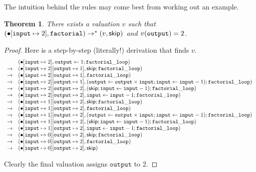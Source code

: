 \documentclass{amsbook}
\newtheorem{theorem}{Theorem}[chapter]
\theoremstyle{definition}
\theoremstyle{remark}
\numberwithin{section}{chapter}
\numberwithin{equation}{chapter}
\begin{document}
The intuition behind the rules may come best from working out an example.

\newcommand{\smallsteps}[2]{#1 \to^* #2}

\begin{theorem}
  There exists a valuation $v$ such that $\smallsteps{(\mupd{\mempty}{\mathtt{input}}{2}, \mathtt{factorial})}{(v, \skipe)}$ and $v(\mathtt{output}) = 2$.
\end{theorem}

\begin{proof}
  Here is a step-by-step (literally!) derivation that finds $v$.
  $$\begin{array}{cl}
    & (\bullet[\mathtt{input} \mapsto 2], \mathtt{output} \leftarrow 1; \mathtt{factorial\_loop}) \\
    \to & (\bullet[\mathtt{input} \mapsto 2][\mathtt{output} \mapsto 1], \mathsf{skip}; \mathtt{factorial\_loop}) \\
    \to & (\bullet[\mathtt{input} \mapsto 2][\mathtt{output} \mapsto 1], \mathtt{factorial\_loop}) \\
    \to & (\bullet[\mathtt{input} \mapsto 2][\mathtt{output} \mapsto 1], (\mathtt{output} \leftarrow \mathtt{output} \times \mathtt{input}; \mathtt{input} \leftarrow \mathtt{input} - 1); \mathtt{factorial\_loop}) \\
    \to & (\bullet[\mathtt{input} \mapsto 2][\mathtt{output} \mapsto 2], (\mathsf{skip}; \mathtt{input} \leftarrow \mathtt{input} - 1); \mathtt{factorial\_loop}) \\
    \to & (\bullet[\mathtt{input} \mapsto 2][\mathtt{output} \mapsto 2], \mathtt{input} \leftarrow \mathtt{input} - 1; \mathtt{factorial\_loop}) \\
    \to & (\bullet[\mathtt{input} \mapsto 1][\mathtt{output} \mapsto 2], \mathsf{skip}; \mathtt{factorial\_loop}) \\
    \to & (\bullet[\mathtt{input} \mapsto 1][\mathtt{output} \mapsto 2], \mathtt{factorial\_loop}) \\
    \to & (\bullet[\mathtt{input} \mapsto 1][\mathtt{output} \mapsto 2], (\mathtt{output} \leftarrow \mathtt{output} \times \mathtt{input}; \mathtt{input} \leftarrow \mathtt{input} - 1); \mathtt{factorial\_loop}) \\
    \to & (\bullet[\mathtt{input} \mapsto 1][\mathtt{output} \mapsto 2], (\mathsf{skip}; \mathtt{input} \leftarrow \mathtt{input} - 1); \mathtt{factorial\_loop}) \\
    \to & (\bullet[\mathtt{input} \mapsto 1][\mathtt{output} \mapsto 2], \mathtt{input} \leftarrow \mathtt{input} - 1; \mathtt{factorial\_loop}) \\
    \to & (\bullet[\mathtt{input} \mapsto 0][\mathtt{output} \mapsto 2], \mathsf{skip}; \mathtt{factorial\_loop}) \\
    \to & (\bullet[\mathtt{input} \mapsto 0][\mathtt{output} \mapsto 2], \mathtt{factorial\_loop}) \\
    \to & (\bullet[\mathtt{input} \mapsto 0][\mathtt{output} \mapsto 2], \mathsf{skip})
  \end{array}$$

  Clearly the final valuation assigns $\mathtt{output}$ to 2.
\end{proof}
\end{document}
